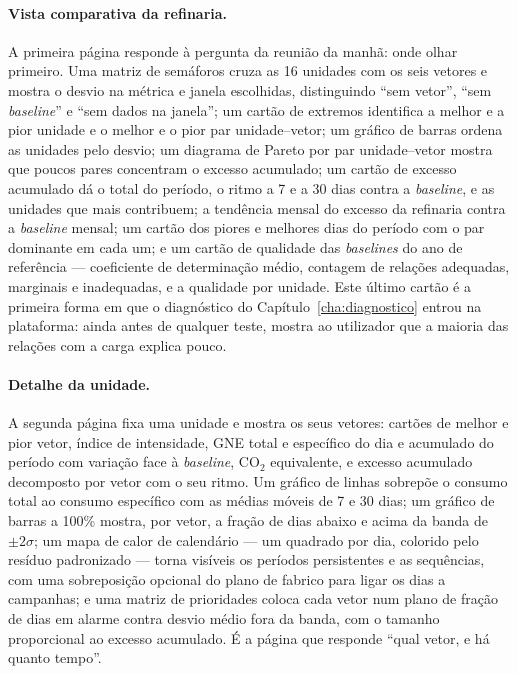 \paragraph{Vista comparativa da refinaria.} A primeira página responde à
pergunta da reunião da manhã: onde olhar primeiro. Uma matriz de
semáforos cruza as 16 unidades com os seis vetores e mostra o desvio na
métrica e janela escolhidas, distinguindo ``sem vetor'', ``sem
\emph{baseline}'' e ``sem dados na janela''; um cartão de extremos
identifica a melhor e a pior unidade e o melhor e o pior par
unidade--vetor; um gráfico de barras ordena as unidades pelo desvio; um
diagrama de Pareto por par unidade--vetor mostra que poucos pares
concentram o excesso acumulado; um cartão de excesso acumulado dá o total
do período, o ritmo a 7 e a 30 dias contra a \emph{baseline}, e as unidades
que mais contribuem; a tendência mensal do excesso da refinaria contra a
\emph{baseline} mensal; um cartão dos piores e melhores dias do período
com o par dominante em cada um; e um cartão de qualidade das
\emph{baselines} do ano de referência --- coeficiente de determinação
médio, contagem de relações adequadas, marginais e inadequadas, e a
qualidade por unidade. Este último cartão é a primeira forma em que o
diagnóstico do Capítulo~\ref{cha:diagnostico} entrou na plataforma: ainda
antes de qualquer teste, mostra ao utilizador que a maioria das relações
com a carga explica pouco.

\paragraph{Detalhe da unidade.} A segunda página fixa uma unidade e mostra
os seus vetores: cartões de melhor e pior vetor, índice de intensidade,
GNE total e específico do dia e acumulado do período com variação face à
\emph{baseline}, CO$_2$ equivalente, e excesso acumulado decomposto por
vetor com o seu ritmo. Um gráfico de linhas sobrepõe o consumo total ao
consumo específico com as médias móveis de 7 e 30 dias; um gráfico de
barras a 100\% mostra, por vetor, a fração de dias abaixo e acima da
banda de $\pm2\sigma$; um mapa de calor de calendário --- um quadrado por
dia, colorido pelo resíduo padronizado --- torna visíveis os períodos
persistentes e as sequências, com uma sobreposição opcional do plano de
fabrico para ligar os dias a campanhas; e uma matriz de prioridades coloca
cada vetor num plano de fração de dias em alarme contra desvio médio
fora da banda, com o tamanho proporcional ao excesso acumulado. É a
página que responde ``qual vetor, e há quanto tempo''.

